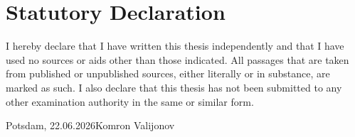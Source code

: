 \chapter*{Statutory Declaration}
    I hereby declare that I have written this thesis independently and that I have used no sources or aids other than those indicated.
    All passages that are taken from published or unpublished sources, either literally or in substance, are marked as such.
    I also declare that this thesis has not been submitted to any other examination authority in the same or similar form.

    \vspace{2cm}
    \noindent Potsdam, 22.06.2026\hfill Komron Valijonov
    \clearpage
